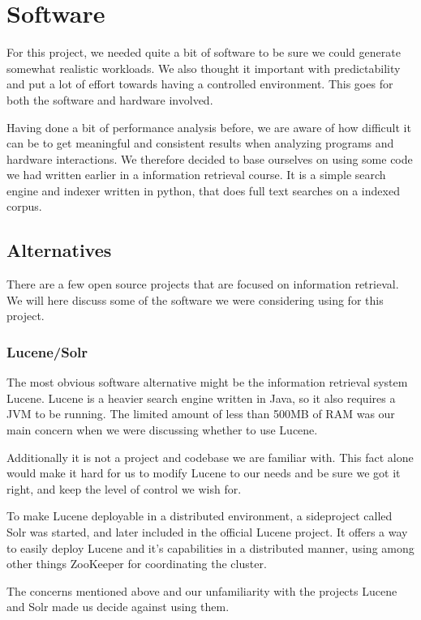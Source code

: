\clearpage
\section{Software}
\label{sec:software}
For this project, we needed quite a bit of software to be sure we could generate somewhat realistic workloads.
We also thought it important with predictability and put a lot of effort towards having a controlled environment. This goes for both the software and hardware involved.

Having done a bit of performance analysis before, we are aware of how difficult it can be to get meaningful and consistent results when analyzing programs and hardware interactions. We therefore decided to base ourselves on using some code we had written earlier in a information retrieval course. It is a simple search engine and indexer written in python, that does full text searches on a indexed corpus.

\subsection{Alternatives}
There are a few open source projects that are focused on information retrieval. We will here discuss some of the software we were considering using for this project.

\subsubsection{Lucene/Solr}
The most obvious software alternative might be the information retrieval system Lucene. Lucene is a heavier search engine written in Java, so it also requires a JVM to be running. The limited amount of less than 500MB of RAM was our main concern when we were discussing whether to use Lucene.

Additionally it is not a project and codebase we are familiar with.
This fact alone would make it hard for us to modify Lucene to our needs and be sure we got it right, and keep the level of control we wish for.

To make Lucene deployable in a distributed environment, a sideproject called Solr was started, and later included in the official Lucene project.
It offers a way to easily deploy Lucene and it's capabilities in a distributed manner, using among other things ZooKeeper for coordinating the cluster.

The concerns mentioned above and our unfamiliarity with the projects Lucene and Solr made us decide against using them.

